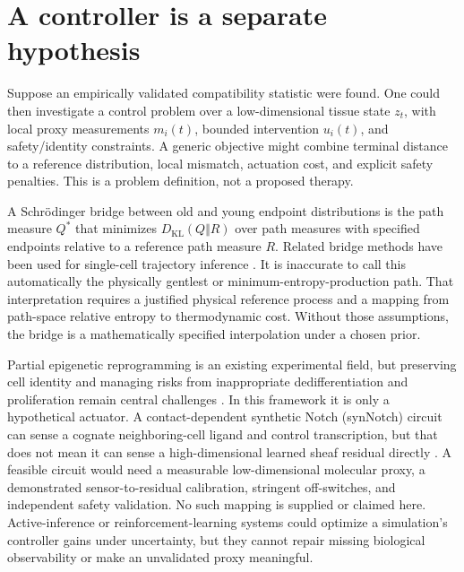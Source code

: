 \documentclass[11pt]{article}
\newcommand{\KL}{D_{\mathrm{KL}}}
\begin{document}
\section{A controller is a separate hypothesis}
Suppose an empirically validated compatibility statistic were found. One could then investigate a control problem over a low-dimensional tissue state $z_t$, with local proxy measurements $m_i(t)$, bounded intervention $u_i(t)$, and safety/identity constraints. A generic objective might combine terminal distance to a reference distribution, local mismatch, actuation cost, and explicit safety penalties. This is a problem definition, not a proposed therapy.

A Schr\"odinger bridge between old and young endpoint distributions is the path measure $Q^*$ that minimizes $\KL(Q\Vert R)$ over path measures with specified endpoints relative to a reference path measure $R$. Related bridge methods have been used for single-cell trajectory inference \cite{hong2025,fournie2026}. It is inaccurate to call this automatically the physically gentlest or minimum-entropy-production path. That interpretation requires a justified physical reference process and a mapping from path-space relative entropy to thermodynamic cost. Without those assumptions, the bridge is a mathematically specified interpolation under a chosen prior.

Partial epigenetic reprogramming is an existing experimental field, but preserving cell identity and managing risks from inappropriate dedifferentiation and proliferation remain central challenges \cite{yucel2024}. In this framework it is only a hypothetical actuator. A contact-dependent synthetic Notch (synNotch) circuit can sense a cognate neighboring-cell ligand and control transcription, but that does not mean it can sense a high-dimensional learned sheaf residual directly \cite{morsut2016}. A feasible circuit would need a measurable low-dimensional molecular proxy, a demonstrated sensor-to-residual calibration, stringent off-switches, and independent safety validation. No such mapping is supplied or claimed here. Active-inference or reinforcement-learning systems could optimize a simulation's controller gains under uncertainty, but they cannot repair missing biological observability or make an unvalidated proxy meaningful.
\end{document}
